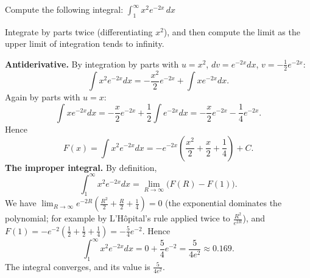 
\begin{question}
Compute the following integral:
$\displaystyle\int_1^\infty x^2e^{-2x}\,dx$
\end{question}

\begin{hint}
Integrate by parts twice (differentiating $x^2$), and then compute the limit as the upper limit of integration tends to infinity.
\end{hint}

\begin{solution}
\textbf{Antiderivative.} By integration by parts with $u=x^2$, $dv=e^{-2x}dx$, $v=-\frac12e^{-2x}$:
\[
\int x^2e^{-2x}dx=-\frac{x^2}{2}e^{-2x}+\int xe^{-2x}dx.
\]
Again by parts with $u=x$:
\[
\int xe^{-2x}dx=-\frac x2e^{-2x}+\frac12\int e^{-2x}dx=-\frac x2e^{-2x}-\frac14e^{-2x}.
\]
Hence
\[
F(x)=\int x^2e^{-2x}dx=-e^{-2x}\left(\frac{x^2}{2}+\frac x2+\frac14\right)+C.
\]
\textbf{The improper integral.} By definition,
\[
\int_1^\infty x^2e^{-2x}dx=\lim_{R\to\infty}\big(F(R)-F(1)\big).
\]
We have $\lim_{R\to\infty}e^{-2R}\left(\frac{R^2}{2}+\frac R2+\frac14\right)=0$ (the exponential dominates the polynomial; for example by L'Hôpital's rule applied twice to $\frac{R^2}{e^{2R}}$), and $F(1)=-e^{-2}\left(\frac12+\frac12+\frac14\right)=-\frac54e^{-2}$. Hence
\[
\int_1^\infty x^2e^{-2x}dx=0+\frac54e^{-2}=\frac{5}{4e^2}\approx0.169.
\]
The integral converges, and its value is $\frac{5}{4e^2}$.
\end{solution}
